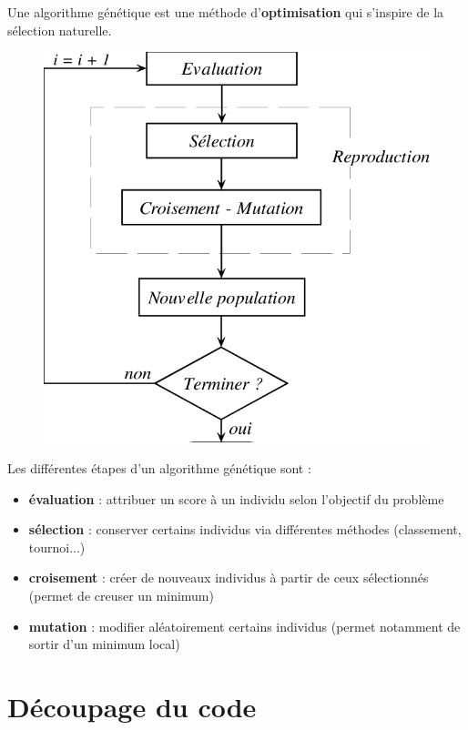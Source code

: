 \documentclass[graphics]{beamer}
\begin{document}
\begin{frame}
	Une algorithme génétique est une méthode d'\textbf{optimisation} qui s'inspire de la sélection naturelle.
	\begin{figure}[H]
		\centering
		\includegraphics[scale=0.2]{algo_gen}
	\end{figure}
\end{frame}

\begin{frame}
	Les différentes étapes d'un algorithme génétique sont :
	\begin{itemize}
		\item \textbf{évaluation} : attribuer un score à un individu selon l'objectif du problème
		\item \textbf{sélection} : conserver certains individus via différentes méthodes (classement, tournoi...)
		\item \textbf{croisement} : créer de nouveaux individus à partir de ceux sélectionnés (permet de creuser un minimum)
		\item \textbf{mutation} : modifier aléatoirement certains individus (permet notamment de sortir d'un minimum local)
	\end{itemize}
\end{frame}

\section{Découpage du code}
\end{document}
